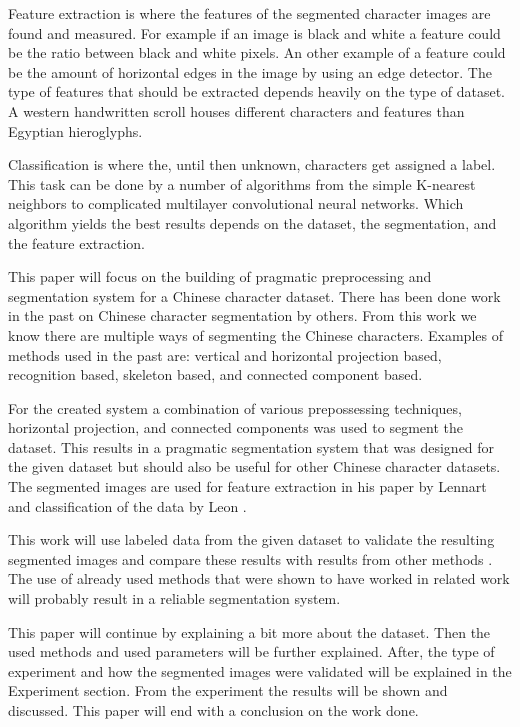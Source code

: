 Feature extraction is where the features of the segmented character images are found and measured. For example if an image is black and white a feature could be the ratio between black and white pixels. An other example of a feature could be the amount of horizontal edges in the image by using an edge detector. The type of features that should be extracted depends heavily on the type of dataset. A western handwritten scroll houses different characters and features than Egyptian hieroglyphs.

Classification is where the, until then unknown, characters get assigned a label. This task can be done by a number of algorithms from the simple K-nearest neighbors to complicated multilayer convolutional neural networks. Which algorithm yields the best results depends on the dataset, the segmentation, and the feature extraction.

This paper will focus on the building of pragmatic preprocessing and segmentation system for a Chinese character dataset. There has been done work in the past on Chinese character segmentation by others. From this work we know there are multiple ways of segmenting the Chinese characters. Examples of methods used in the past are: vertical and horizontal projection based, recognition based, skeleton based, and connected component based.



For the created system a combination of various prepossessing techniques, horizontal projection, and connected components was used to segment the dataset. This results in a pragmatic segmentation system that was designed for the given dataset but should also be useful for other Chinese character datasets. The segmented images are used for feature extraction in his paper by Lennart  and classification of the data by Leon .

This work will use labeled data from the given dataset to validate the resulting segmented images and compare these results with results from other methods . The use of already used methods that were shown to have worked in related work  will probably result in a reliable segmentation system.

This paper will continue by explaining a bit more about the dataset. Then the used methods and used parameters will be further explained. After, the type of experiment and how the segmented images were validated will be explained in the Experiment section. From the experiment the results will be shown and discussed. This paper will end with a conclusion on the work done.

